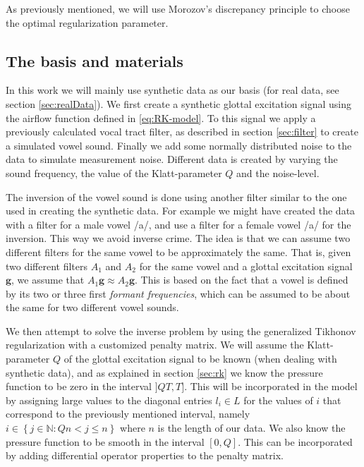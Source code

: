 \documentclass[12pt,a4]{article}
\newcommand{\N}{{\mathbb N}}
\newcommand{\vc}[1]{\ensuremath{\bm{#1}}}
\begin{document}
As previously mentioned, we will use Morozov's discrepancy principle to choose the optimal regularization parameter.

\subsection{The basis and materials}
\label{sec:basis}

In this work we will mainly use synthetic data as our basis (for real data, see section \ref{sec:realData}). We first create a synthetic glottal excitation signal using the airflow function defined in \eqref{eq:RK-model}. To this signal we apply a previously calculated vocal tract filter, as described in section \ref{sec:filter} to create a simulated vowel sound. Finally we add some normally distributed noise to the data to simulate measurement noise. Different data is created by varying the sound frequency, the value of the Klatt-parameter $Q$ and the noise-level.

The inversion of the vowel sound is done using another filter similar to the one used in creating the synthetic data. For example we might have created the data with a filter for a male vowel /a/, and use a filter for a female vowel /a/ for the inversion. This way we avoid inverse crime. The idea is that we can assume two different filters for the same vowel to be approximately the same. That is, given two different filters $A_1$ and $A_2$ for the same vowel and a glottal excitation signal $\vc{g}$, we assume that $A_1 \vc{g} \approx A_2 \vc{g}$. This is based on the fact that a vowel is defined by its two or three first \emph{formant frequencies}, which can be assumed to be about the same for two different vowel sounds.\cite{digitalmodels}

We then attempt to solve the inverse problem by using the generalized Tikhonov regularization with a customized penalty matrix. We will assume the Klatt-parameter $Q$ of the glottal excitation signal to be known (when dealing with synthetic data), and as explained in section \ref{sec:rk} we know the pressure function to be zero in the interval $]QT, T]$. This will be incorporated in the model by assigning large values to the diagonal entries $l_i \in L$ for the values of $i$ that correspond to the previously mentioned interval, namely $i \in \left\{ j \in \N : Qn < j \leq n \right\}$ where $n$ is the length of our data. We also know the pressure function to be smooth in the interval $[0, Q]$. This can be incorporated by adding differential operator properties to the penalty matrix.
\end{document}
